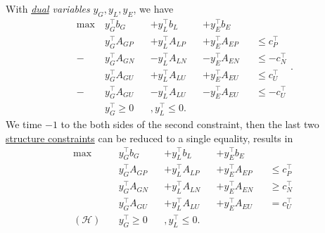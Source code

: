 With \emph{\hyperref[def:dual]{dual} variables} \(y_G, y_L, y_E\), we have
\[
	\begin{alignedat}{4}
		\max~ & y^{\top}_G b_G &&+ y^{\top}_L b_L &&+ y^{\top}_E b_E                     \\
		& y^{\top}_G A_{GP} &&+ y^{\top}_L A_{LP} &&+ y^{\top}_E A_{EP} &&\leq c^{\top}_P   \\
		-& y^{\top}_G A_{GN} &&- y^{\top}_L A_{LN} &&- y^{\top}_E A_{EN} &&\leq -c^{\top}_N \\
		& y^{\top}_G A_{GU} &&+ y^{\top}_L A_{LU} &&+ y^{\top}_E A_{EU} &&\leq c^{\top}_U   \\
		-& y^{\top}_G A_{GU} &&- y^{\top}_L A_{LU} &&- y^{\top}_E A_{EU} &&\leq -c^{\top}_U \\
		&y^{\top}_G \geq 0&&, y^{\top}_L\leq 0.
	\end{alignedat}.
\]
We time \(-1\) to the both sides of the second constraint, then the last two \hyperref[def:structured-constraint]{structure constraints} can be reduced to a single equality, results in
\[
	\begin{alignedat}{4}
		\max~ & y^{\top}_G b_G &&+ y^{\top}_L b_L &&+ y^{\top}_E b_E                     \\
		& y^{\top}_G A_{GP} &&+ y^{\top}_L A_{LP} &&+ y^{\top}_E A_{EP} &&\leq c^{\top}_P   \\
		& y^{\top}_G A_{GN} &&+ y^{\top}_L A_{LN} &&+ y^{\top}_E A_{EN} &&\geq c^{\top}_N \\
		& y^{\top}_G A_{GU} &&+ y^{\top}_L A_{LU} &&+ y^{\top}_E A_{EU} && = c^{\top}_U     \\
		(\mathcal{H})\quad &y^{\top}_G \geq 0&&, y^{\top}_L\leq 0.
	\end{alignedat}
\]

